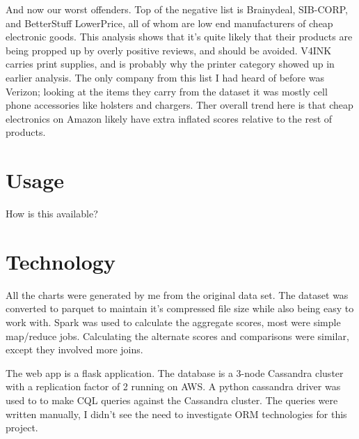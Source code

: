 \documentclass[a4paper,10pt]{article}
\begin{document}
And now our worst offenders. Top of the negative list is Brainydeal, SIB-CORP, and BetterStuff LowerPrice, all of whom are low end manufacturers of cheap electronic goods. This analysis shows that it's quite likely that their products are being propped up by overly positive reviews, and should be avoided. V4INK carries print supplies, and is probably why the printer category showed up in earlier analysis. The only company from this list I had heard of before was Verizon; looking at the items they carry from the dataset it was mostly cell phone accessories like holsters and chargers. Ther overall trend here is that cheap electronics on Amazon likely have extra inflated scores relative to the rest of products.

\section*{Usage}
How is this available?

\section*{Technology}
All the charts were generated by me from the original data set. The dataset was converted to parquet to maintain it's compressed file size while also being easy to work with. Spark was used to calculate the aggregate scores, most were simple map/reduce jobs. Calculating the alternate scores and comparisons were similar, except they involved more joins.

The web app is a flask application. The database is a 3-node Cassandra cluster with a replication factor of 2 running on AWS. A python cassandra driver was used to to make CQL queries against the Cassandra cluster. The queries were written manually, I didn't see the need to investigate ORM technologies for this project.
\end{document}
